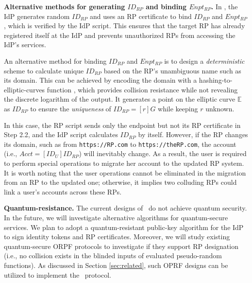 \noindent \textbf{Alternative methods for generating $ID_{RP}$ and binding $Enpt_{RP}$.}
In \usso, the IdP generates random $ID_{RP}$ and uses an RP certificate to bind $ID_{RP}$ and $Enpt_{RP}$, which is verified by the IdP script. This ensures that the target RP has already registered itself at the IdP and prevents unauthorized RPs from accessing the IdP's services.

An alternative method for binding $ID_{RP}$ and $Enpt_{RP}$ is
 to design a \emph{deterministic} scheme to calculate unique $ID_{RP}$ based on the RP's unambiguous name such as its domain.
This can be achieved by encoding the domain with a hashing-to-elliptic-curves function \cite{irtf-cfrg-hash-to-curve-16}, which provides collision resistance while not revealing the discrete logarithm of the output. It generates a point on the elliptic curve $\mathbb{E}$ as $ID_{RP}$ to ensure the \emph{uniqueness} of $ID_{RP} = [r]G$ while keeping $r$ unknown. %

In this case, the RP script sends only the endpoint but not its RP certificate in Step 2.2, and the IdP script calculates $ID_{RP}$ by itself. %
However, if the RP changes its domain, such as from \verb+https://RP.com+ to \verb+https://theRP.com+, the account (i.e., $Acct = [ID_U]ID_{RP}$) will inevitably change.
As a result, the user is required to perform special operations to migrate her account to the updated RP system.
It is worth noting that the user operations cannot be eliminated in the migration from an RP to the updated one;
otherwise, it implies two colluding RPs could link a user's accounts across these RPs.

\newc
\noindent \textbf{Quantum-resistance.}
The current designs of \usso\ do not achieve quantum security.
In the future, we will investigate alternative algorithms for quantum-secure services.
We plan to adopt a quantum-resistant public-key algorithm for the IdP to sign identity tokens and RP certificates.
Moreover, we will study existing quantum-secure ORPF protocols \cite{ideal-lattice-oprf,isogency-oprf}
 to investigate if they support RP designation (i.e., no collision exists in the blinded inputs of evaluated pseudo-random functions).
As discussed in Section \ref{sec:related}, such OPRF designs can be utilized to implement the \usso\ protocol.

